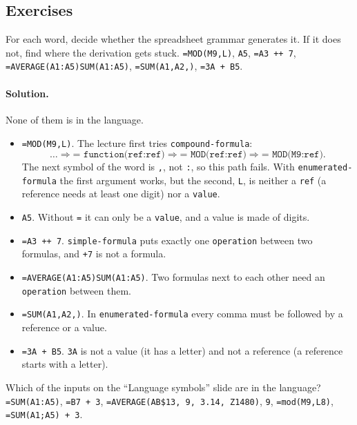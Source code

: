 \subsection{Exercises}

\begin{exercise}
For each word, decide whether the spreadsheet grammar generates it. If it
does not, find where the derivation gets stuck.
\texttt{=MOD(M9,L)}, \texttt{A5}, \texttt{=A3 ++ 7},
\texttt{=AVERAGE(A1:A5)SUM(A1:A5)}, \texttt{=SUM(A1,A2,)}, \texttt{=3A + B5}.
\end{exercise}

\paragraph{Solution.} None of them is in the language.
\begin{itemize}
  \item \texttt{=MOD(M9,L)}. The lecture first tries
    \texttt{compound-formula}:
    \[
      \ldots \Rightarrow \texttt{= function(ref:ref)}
      \Rightarrow \texttt{= MOD(ref:ref)} \Rightarrow \texttt{= MOD(M9:ref)}.
    \]
    The next symbol of the word is \texttt{,}, not \texttt{:}, so this path
    fails. With \texttt{enumerated-formula} the first argument works, but the
    second, \texttt{L}, is neither a \texttt{ref} (a reference needs at least
    one digit) nor a \texttt{value}.
  \item \texttt{A5}. Without \texttt{=} it can only be a \texttt{value}, and a
    value is made of digits.
  \item \texttt{=A3 ++ 7}. \texttt{simple-formula} puts exactly one
    \texttt{operation} between two formulas, and \texttt{+7} is not a formula.
  \item \texttt{=AVERAGE(A1:A5)SUM(A1:A5)}. Two formulas next to each other
    need an \texttt{operation} between them.
  \item \texttt{=SUM(A1,A2,)}. In \texttt{enumerated-formula} every comma must
    be followed by a reference or a value.
  \item \texttt{=3A + B5}. \texttt{3A} is not a value (it has a letter) and not
    a reference (a reference starts with a letter).
\end{itemize}

\begin{exercise}
Which of the inputs on the ``Language symbols'' slide are in the language?
\texttt{=SUM(A1:A5)}, \texttt{=B7 + 3}, \texttt{=AVERAGE(AB\$13, 9, 3.14, Z1480)},
\texttt{9}, \texttt{=mod(M9,L8)}, \texttt{=SUM(A1;A5) + 3}.
\end{exercise}

